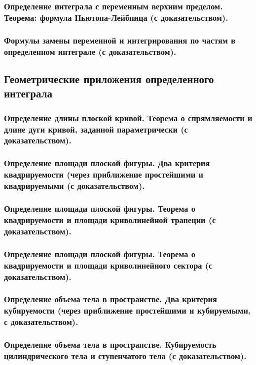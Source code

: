 \documentclass[10pt]{article}
\begin{document}
    \subsubsection{Определение интеграла с переменным верхним пределом. Теорема: формула Ньютона-Лейбница (с доказательством).}
    \subsubsection{Формулы замены переменной и интегрирования по частям в определенном интеграле (с доказательством).}
    \subsection{Геометрические приложения определенного интеграла}
    \subsubsection{Определение длины плоской кривой. Теорема о спрямляемости и длине дуги кривой, заданной параметрически (с доказательством).}
    \subsubsection{Определение площади плоской фигуры. Два критерия квадрируемости (через приближение простейшими и квадрируемыми (с доказательством).}
    \subsubsection{Определение площади плоской фигуры. Теорема о квадрируемости и площади криволинейной трапеции (с доказательством).}
    \subsubsection{Определение площади плоской фигуры. Теорема о квадрируемости и площади криволинейного сектора (с доказательством).}
    \subsubsection{Определение объема тела в пространстве. Два критерия кубируемости (через приближение простейшими и кубируемыми, с доказательством).}
    \subsubsection{Определение объема тела в пространстве. Кубируемость цилиндрического тела и ступенчатого тела (с доказательством).}
\end{document}
